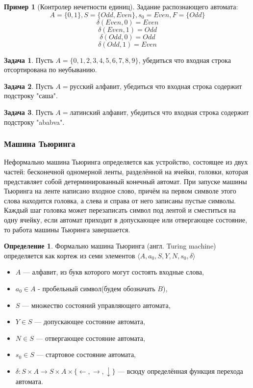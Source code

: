 \documentclass[10pt,twoside]{article}
\theoremstyle{plain}
\theoremstyle{definition}
\newtheorem{defi}{Определение}
\newtheorem*{example}{Пример}
\newtheorem{problem}{Задача}
\begin{document}
\begin{example}[Контролер нечетности единиц]
Задание распознающего автомата:
$$A=\{0,1\},S=\{Odd, Even\},s_0=Even,F=\{Odd\}$$
$$\delta(Even,0)=Even$$
$$\delta(Even,1)=Odd$$
$$\delta(Odd,0)=Odd$$
$$\delta(Odd,1)=Even$$
\end{example}

\begin{problem}
  Пусть $A=\{0,1,2,3,4,5,6,7,8,9\}$, убедиться что входная строка отсортирована по неубыванию.
\end{problem}

\begin{problem}
  Пусть $A=\text{русский алфавит}$, убедиться что входная строка содержит подстроку "саша".
\end{problem}

\begin{problem}
  Пусть $A=\text{латинский алфавит}$, убедиться что входная строка содержит подстроку "ababva".
\end{problem}

\subsubsection{Машина Тьюринга}

Неформально машина Тьюринга определяется как устройство, состоящее из двух частей: бесконечной одномерной ленты, разделённой на ячейки, головки, которая представляет собой детерминированный конечный автомат.
При запуске машины Тьюринга на ленте написано входное слово, причём на первом символе этого слова находится головка, а слева и справа от него записаны пустые символы. Каждый шаг головка может перезаписать символ под лентой и сместиться на одну ячейку, если автомат приходит в допускающее или отвергающее состояние, то работа машины Тьюринга завершается.
\begin{defi}
Формально машина Тьюринга (англ. Turing machine) определяется как кортеж из семи элементов $\langle A, a_0, S, Y, N, s_0, \delta \rangle$
\begin{itemize}
  \item $A$ — алфавит, из букв которого могут состоять входные слова,
  \item $a_0 \in A$ - пробельный символ(будем обозначать $B$),
  \item $S$ — множество состояний управляющего автомата,
  \item $Y \in S$ — допускающее состояние автомата,
  \item $N \in S$ — отвергающее состояние автомата,
  \item $s_0 \in S$ — стартовое состояние автомата,
  \item $\delta : S \times A \to S \times A \times \{ \leftarrow, \rightarrow, \downarrow \}$ — всюду определённая функция перехода автомата.
\end{itemize}
\end{defi}
\end{document}
